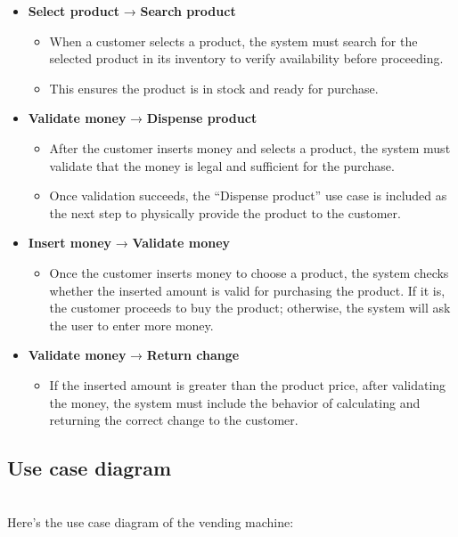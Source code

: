\begin{itemize}
\item
\protect{}\label{PtTTrqta9nZ09MHXEORxh}
\textbf{Select product} → \textbf{Search product}

\begin{itemize}
\item
When a customer selects a product, the system must search for the selected product in its inventory to verify availability before proceeding.
\item
This ensures the product is in stock and ready for purchase.
\end{itemize}
\item
\protect{}\label{U3R-f-ic3C68hOrsqPGgk}
\textbf{Validate money} → \textbf{Dispense product}

\begin{itemize}
\item
After the customer inserts money and selects a product, the system must validate that the money is legal and sufficient for the purchase.
\item
Once validation succeeds, the ``Dispense product'' use case is included as the next step to physically provide the product to the customer.
\end{itemize}
\item
\protect{}\label{vOXKZ6EvnQxgXyRXXtEE0}
\textbf{Insert money} → \textbf{Validate money}

\begin{itemize}
\item
Once the customer inserts money to choose a product, the system checks whether the inserted amount is valid for purchasing the product. If it is, the customer proceeds to buy the product; otherwise, the system will ask the user to enter more money.
\end{itemize}
\item
\protect{}\label{x1CEaRCL492_aGQORd0NP}
\textbf{Validate money} → \textbf{Return change}

\begin{itemize}
\item
If the inserted amount is greater than the product price, after validating the money, the system must include the behavior of calculating and returning the correct change to the customer.
\end{itemize}
\end{itemize}

\subsection{Use case diagram}\label{CIpH3srIZCSszs9jPiB8J}
\\
Here's the use case diagram of the vending machine:

